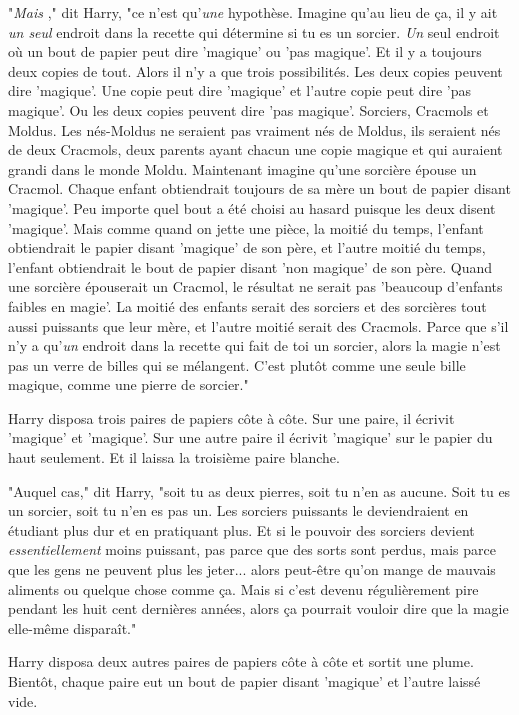 "\emph{Mais} ," dit Harry, "ce n'est qu'\emph{une}  hypothèse. Imagine qu'au lieu de ça, il y ait \emph{un seul}  endroit dans la recette qui détermine si tu es un sorcier. \emph{Un}  seul endroit où un bout de papier peut dire 'magique' ou 'pas magique'. Et il y a toujours deux copies de tout. Alors il n'y a que trois possibilités. Les deux copies peuvent dire 'magique'. Une copie peut dire 'magique' et l'autre copie peut dire 'pas magique'. Ou les deux copies peuvent dire 'pas magique'. Sorciers, Cracmols et Moldus. Les nés-Moldus ne seraient pas vraiment nés de Moldus, ils seraient nés de deux Cracmols, deux parents ayant chacun une copie magique et qui auraient grandi dans le monde Moldu. Maintenant imagine qu'une sorcière épouse un Cracmol. Chaque enfant obtiendrait toujours de sa mère un bout de papier disant 'magique'. Peu importe quel bout a été choisi au hasard puisque les deux disent 'magique'. Mais comme quand on jette une pièce, la moitié du temps, l'enfant obtiendrait le papier disant 'magique' de son père, et l'autre moitié du temps, l'enfant obtiendrait le bout de papier disant 'non magique' de son père. Quand une sorcière épouserait un Cracmol, le résultat ne serait pas 'beaucoup d'enfants faibles en magie'. La moitié des enfants serait des sorciers et des sorcières tout aussi puissants que leur mère, et l'autre moitié serait des Cracmols. Parce que s'il n'y a qu'\emph{un}  endroit dans la recette qui fait de toi un sorcier, alors la magie n'est pas un verre de billes qui se mélangent. C'est plutôt comme une seule bille magique, comme une pierre de sorcier."

Harry disposa trois paires de papiers côte à côte. Sur une paire, il écrivit 'magique' et 'magique'. Sur une autre paire il écrivit 'magique' sur le papier du haut seulement. Et il laissa la troisième paire blanche.

"Auquel cas," dit Harry, "soit tu as deux pierres, soit tu n'en as aucune. Soit tu es un sorcier, soit tu n'en es pas un. Les sorciers puissants le deviendraient en étudiant plus dur et en pratiquant plus. Et si le pouvoir des sorciers devient \emph{essentiellement } moins puissant, pas parce que des sorts sont perdus, mais parce que les gens ne peuvent plus les jeter... alors peut-être qu'on mange de mauvais aliments ou quelque chose comme ça. Mais si c'est devenu régulièrement pire pendant les huit cent dernières années, alors ça pourrait vouloir dire que la magie elle-même disparaît."

Harry disposa deux autres paires de papiers côte à côte et sortit une plume. Bientôt, chaque paire eut un bout de papier disant 'magique' et l'autre laissé vide.

